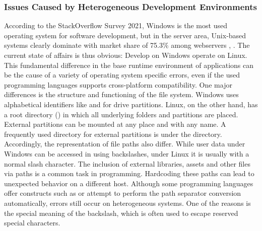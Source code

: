 \documentclass[12pt, a4paper]{article}
\begin{document}
        \subsubsection{Issues Caused by Heterogeneous Development Environments}\label{sss::hetero}
        According to the StackOverflow Survey 2021, Windows is the most used operating system for software development, but in the server area, Unix-based systems clearly dominate with market share of 75.3\% among webservers \cite{stackoverflow2021}, \cite{unixusage}. The current state of affairs is thus obvious: Develop on Windows operate on Linux. This fundamental difference in the base runtime environment of applications can be the cause of a variety of operating system specific errors, even if the used programming languages supports cross-platform compatibility. One major differences is the structure and functioning of the file system. Windows uses alphabetical identifiers like  and  for drive partitions. Linux, on the other hand, has a root directory (\code{/}) in which all underlying folders and partitions are placed. External partitions can be mounted at any place and with any name. A frequently used directory for external partitions is under the  directory. Accordingly, the representation of file paths also differ. While user data under Windows can be accessed in  using backslashes, under Linux it is usually  with a normal slash character. The inclusion of external libraries, assets and other files via paths is a common task in programming. Hardcoding these paths can lead to unexpected behavior on a different host. Although some programming languages offer constructs such as  or attempt to perform the path separator conversion automatically, errors still occur on heterogeneous systems. One of the reasons is the special meaning of the backslash, which is often used to escape reserved special characters.\newline
\end{document}
